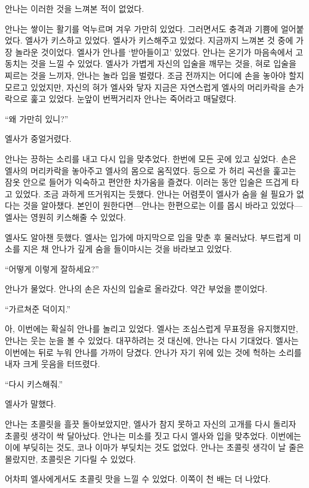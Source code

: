 안나는 이러한 것을 느껴본 적이 없었다.

안나는 쌓이는 활기를 억누르며 겨우 가만히 있었다. 그러면서도 충격과 기쁨에 얼어붙었다. 엘사가 키스하고 있었다. 엘사가 키스해주고 있었다. 지금까지 느껴본 것 중에 가장 놀라운 것이었다. 엘사가 안나를 `받아들이고' 있었다. 안나는 온기가 마음속에서 고동치는 것을 느낄 수 있었다. 엘사가 가볍게 자신의 입술을 깨무는 것을, 혀로 입술을 찌르는 것을 느끼자, 안나는 놀라 입을 벌렸다. 조금 전까지는 어디에 손을 놓아야 할지 모르고 있었지만, 자신의 혀가 엘사와 닿자 지금은 자연스럽게 엘사의 머리카락을 손가락으로 훑고 있었다. 눈앞이 번쩍거리자 안나는 죽어라고 매달렸다.

``왜 가만히 있니?''

엘사가 중얼거렸다.

안나는 끙하는 소리를 내고 다시 입을 맞추었다. 한번에 모든 곳에 있고 싶었다. 손은 엘사의 머리카락을 놓아주고 엘사의 몸으로 움직였다. 등으로 가 허리 곡선을 훑고는 잠옷 안으로 들어가 익숙하고 편안한 차가움을 즐겼다. 이러는 동안 입술은 뜨겁게 타고 있었다. 조금 과하게 뜨거워지는 듯했다. 안나는 어렴풋이 엘사가 숨을 쉴 필요가 없다는 것을 알아챘다. 본인이 원한다면—안나는 한편으로는 이를 몹시 바라고 있었다—엘사는 영원히 키스해줄 수 있었다.

엘사도 알아챈 듯했다. 엘사는 입가에 마지막으로 입을 맞춘 후 물러났다. 부드럽게 미소를 지은 채 안나가 깊게 숨을 들이마시는 것을 바라보고 있었다.

``어떻게 이렇게 잘하세요?''

안나가 물었다. 안나의 손은 자신의 입술로 올라갔다. 약간 부었을 뿐이었다.

``가르쳐준 덕이지.''

아, 이번에는 확실히 안나를 놀리고 있었다. 엘사는 조심스럽게 무표정을 유지했지만, 안나는 웃는 눈을 볼 수 있었다. 대꾸하려는 것 대신에, 안나는 다시 기대었다. 엘사는 이번에는 뒤로 누워 안나를 가까이 당겼다. 안나가 자기 위에 있는 것에 헉하는 소리를 내자 크게 웃음을 터뜨렸다.

``다시 키스해줘.''

엘사가 말했다.

안나는 초콜릿을 흘끗 돌아보았지만, 엘사가 참지 못하고 자신의 고개를 다시 돌리자 초콜릿 생각이 싹 달아났다. 안나는 미소를 짓고 다시 엘사와 입을 맞추었다. 이번에는 이에 부딪히는 것도, 코나 이마가 부딪치는 것도 없었다. 안나는 초콜릿 생각이 날 줄은 몰랐지만, 초콜릿은 기다릴 수 있었다.

어차피 엘사에게서도 초콜릿 맛을 느낄 수 있었다. 이쪽이 천 배는 더 나았다.

